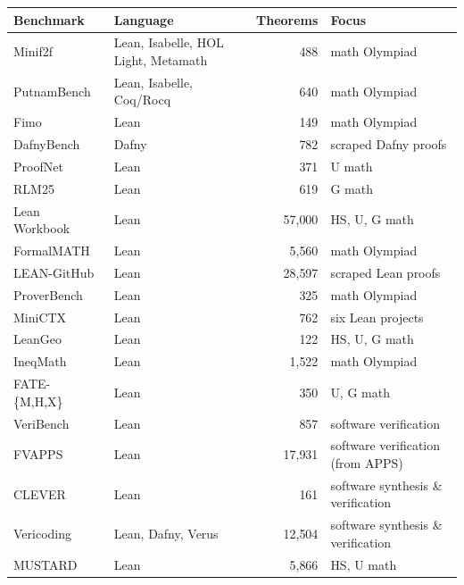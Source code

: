 \begin{table}[h]
\centering
\footnotesize
\setlength{\tabcolsep}{4pt}
\renewcommand{\arraystretch}{1.05}
\begin{tabularx}{\textwidth}{@{}
    >{\raggedright\arraybackslash}p{3.3cm}
    l
    r
    >{\raggedright\arraybackslash}X@{}}
\textbf{Benchmark} & \textbf{Language} & \textbf{Theorems} & \textbf{Focus} \\
\midrule
Minif2f~\cite{zheng2021minif2f}
  & Lean, Isabelle, HOL Light, Metamath & 488 & math Olympiad \\
PutnamBench~\cite{tsoukalas2024putnambench}
  & Lean, Isabelle, Coq/Rocq & 640 & math Olympiad \\
Fimo~\cite{liu2023fimo}
  & Lean & 149 & math Olympiad \\
DafnyBench~\cite{loughridge2024dafnybench}
  & Dafny & 782 & scraped Dafny proofs \\
ProofNet~\cite{azerbayev2023proofnet}
  & Lean & 371 & U math \\
RLM25~\cite{poiroux2025reliable}
  & Lean & 619 & G math \\
Lean Workbook~\cite{ying2024lean}
  & Lean & 57{,}000 & HS, U, G math \\
FormalMATH~\cite{yu2025formalmath}
  & Lean & 5{,}560 & math Olympiad \\
LEAN-GitHub~\cite{wu2024lean}
  & Lean & 28{,}597 & scraped Lean proofs \\
ProverBench~\cite{ren2025deepseek}
  & Lean & 325 & math Olympiad \\
MiniCTX~\cite{hu2024minictx}
  & Lean & 762 & six Lean projects \\
LeanGeo~\cite{leangeo}
  & Lean & 122 & HS, U, G math \\
IneqMath~\cite{lu2025solving}
  & Lean & 1{,}522 & math Olympiad \\
FATE-\{M,H,X\}~\cite{jiang2025fate}
  & Lean & 350 & U, G math \\
VeriBench~\cite{barkallah2025veribench}
  & Lean & 857 & software verification \\
FVAPPS~\cite{dougherty2025proving}
  & Lean & 17{,}931  & software verification (from APPS) \\
CLEVER~\cite{thakur2025clever}
  & Lean & 161 & software synthesis \& verification \\
Vericoding~\cite{bursuc2025benchmark}
  & Lean, Dafny, Verus & 12{,}504 & software synthesis \& verification \\
MUSTARD~\cite{huang2024mustard}
  & Lean & 5{,}866 & HS, U math \\

\end{tabularx}
\end{table}
